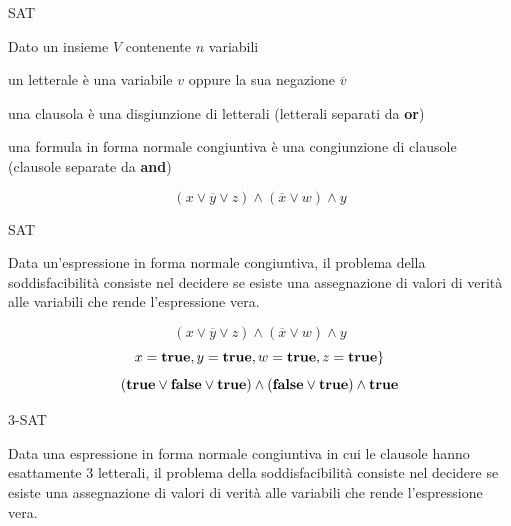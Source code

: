 \begin{frame}{SAT}

\vspace{-9pt}
\begin{myboxtitle}
Dato un insieme $V$ contenente $n$ \alert{variabili}
\BIL
\item un \alert{letterale} è una variabile $v$ oppure la sua negazione $\overline{v}$
\item una \alert{clausola} è una disgiunzione di letterali (letterali separati da \textbf{or})
\item una \alert{formula in forma normale congiuntiva} è una congiunzione di clausole (clausole separate da \textbf{and})
\EIL
\end{myboxtitle}

\begin{myboxtitle}[Esempio]
\[
  (x \vee \overline{y} \vee z) \wedge (\overline{x} \vee w) \wedge y
\]
\end{myboxtitle}

\end{frame}

\begin{frame}{SAT}

\vspace{-9pt}
\begin{myboxtitle}
Data un'espressione in forma normale congiuntiva, il problema
della \alert{soddisfacibilità} consiste nel decidere se esiste una
assegnazione di valori di verità alle variabili che rende
l'espressione vera. 
\end{myboxtitle}

\begin{myboxtitle}[Esempio]
\[
  (x \vee \overline{y} \vee z) \wedge (\overline{x} \vee w) \wedge y
\]
\pause
\[
x = \TRUE, y = \TRUE, w = \TRUE, z = \TRUE \}
\]
\[
  (\TRUE \vee \FALSE \vee \TRUE) \wedge (\FALSE \vee \TRUE) \wedge \TRUE
\]
\end{myboxtitle}

\end{frame}

\begin{frame}{3-SAT}

\vspace{-9pt}
\begin{myboxtitle}
Data una espressione in forma normale congiuntiva in cui le
clausole \alert{hanno esattamente 3 letterali}, il problema della soddisfacibilità  consiste nel decidere se esiste una assegnazione di valori di verità alle variabili che rende l'espressione vera. 
\end{myboxtitle}

\bigskip
{}

\end{frame}




